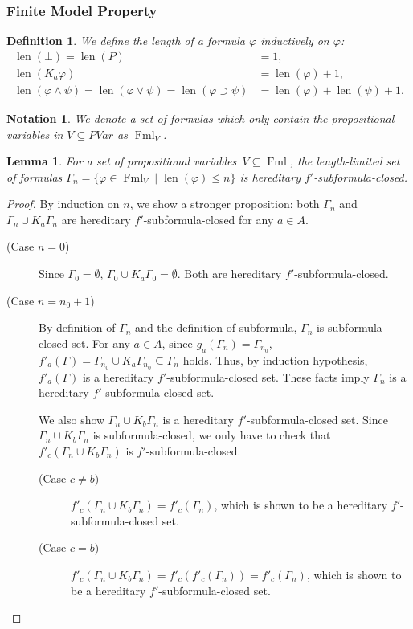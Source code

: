 \documentclass[doctor]{iscs-thesis}
\newcommand{\len}[0]{\operatorname{len}}
\newcommand{\fml}{\operatorname{Fml}}
\newtheorem{notation}{Notation}
\newtheorem{definition}{Definition}
\newtheorem{lemma}{Lemma}
\begin{document}
\subsubsection{Finite Model Property}

\begin{definition}
 We define the length of a formula $\varphi$ inductively on $\varphi$:
 \begin{align*}
  \len(\bot) = \len(P) &= 1,\\
  \len(K_a\varphi) &= \len(\varphi) + 1,\\
  \len(\varphi\wedge\psi) = \len(\varphi\vee\psi) = \len(\varphi\supset\psi)
  &=\len(\varphi) + \len(\psi) + 1.
 \end{align*}
\end{definition}

\begin{notation}
 We denote a set of formulas which only contain the propositional variables in
 $V\subseteq PVar$ as $\fml_V$.
\end{notation}

\begin{lemma}
 \label{shorter}
 For a set of propositional variables~$V\subseteq \fml$,
 the length-limited set of formulas 
 $\Gamma_n = \{\varphi\in \fml_V\mid\len(\varphi)\le n\}$
 is hereditary $f'$-subformula-closed.
\end{lemma}
\begin{proof}
 By induction on $n$, we show a stronger proposition:
 both $\Gamma_n$ and $\Gamma_n\cup K_a\Gamma_n$ are
 hereditary $f'$-subformula-closed for any $a\in A$.
 \begin{description}
  \item[ (Case $n = 0$)]
	     Since $\Gamma_0 = \emptyset$, $\Gamma_0\cup K_a\Gamma_0 = \emptyset$.
	     Both are hereditary $f'$-subformula-closed.
  \item[ (Case $n = n_0 + 1$)]
	     By definition of $\Gamma_n$ and the definition of subformula, $\Gamma_n$ is
	     subformula-closed set.
	     For any $a\in A$, since $g_a(\Gamma_n) = \Gamma_{n_0}$,
	     $f'_a(\Gamma) = \Gamma_{n_0}\cup K_a\Gamma_{n_0} \subseteq \Gamma_n$ holds.
	     Thus, by induction hypothesis, $f'_a(\Gamma)$ is a hereditary
	     $f'$-subformula-closed set.
	     These facts imply $\Gamma_n$ is a hereditary $f'$-subformula-closed set.

	     We also show $\Gamma_n\cup K_b\Gamma_n$ is a hereditary
	     $f'$-subformula-closed set.
	     Since $\Gamma_n\cup K_b\Gamma_n$ is subformula-closed,
	     we only have to check that $f'_c(\Gamma_n\cup K_b\Gamma_n)$ is $f'$-subformula-closed.
	     \begin{description}
	      \item[ (Case $c\neq b$)]
			 $f'_c(\Gamma_n\cup K_b\Gamma_n) = f'_c(\Gamma_n)$, which is shown
			 to be a hereditary $f'$-subformula-closed set.
	      \item[ (Case $c = b$)]
			 $f'_c(\Gamma_n\cup K_b\Gamma_n) = f'_c(f'_c(\Gamma_n)) =
			 f'_c(\Gamma_n)$,
			 which is shown to be a hereditary $f'$-subformula-closed set.
	     \end{description}
 \end{description}
\end{proof}
\end{document}
